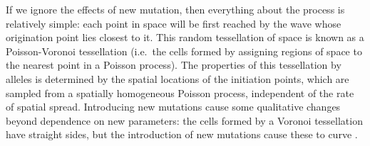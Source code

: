 \documentclass{article}
\begin{document}
If we ignore the effects of new mutation,
then everything about the process is relatively simple:
each point in space will be first reached by the wave whose origination point lies closest to it.
This random tessellation of space is known as a Poisson-Voronoi tessellation \citep{Moller:94}
(i.e.\ the cells formed by assigning regions of space to the nearest point in a Poisson process).
The properties of this tessellation by alleles is
determined by the spatial locations of the initiation points, 
which are sampled from a spatially homogeneous Poisson process, 
independent of the rate of spatial spread. 
Introducing new mutations cause some qualitative changes
beyond dependence on new parameters:
the cells formed by a Voronoi tessellation have straight sides,
but the introduction of new mutations cause these to curve \citep[see
Figure 1 of ][ for a graphical depiction of this point]{ralphcoop2010}.
\end{document}
